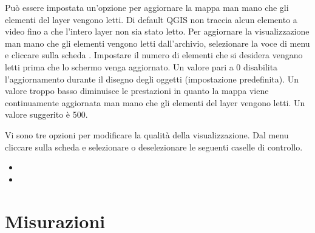 %
%

\label{label_updatemap}

Può essere impostata un'opzione per aggiornare la mappa man mano che gli
elementi del layer vengono letti. Di default QGIS non traccia alcun elemento a video
fino a che l'intero layer non sia stato letto. Per aggiornare la visualizzazione
man mano che gli elementi vengono letti dall'archivio, selezionare la
voce di menu  \arrow {} e cliccare sulla
scheda . Impostare il numero di elementi che si desidera
vengano letti prima che lo schermo venga aggiornato. Un valore pari a 0
disabilita l'aggiornamento durante il disegno degli oggetti (impostazione
predefinita). Un valore troppo basso diminuisce le prestazioni in quanto la
mappa viene continuamente aggiornata man mano che gli elementi del layer
vengono letti. Un valore suggerito è 500. 

\label{label_renderquality}

Vi sono tre opzioni per modificare la qualità della visualizzazione. Dal menu
 \arrow {} cliccare sulla scheda
 e selezionare o deselezionare le seguenti caselle di controllo.

\begin{itemize}
\item {}
\item {}
\end{itemize}

\section{Misurazioni}\label{sec:measure}

